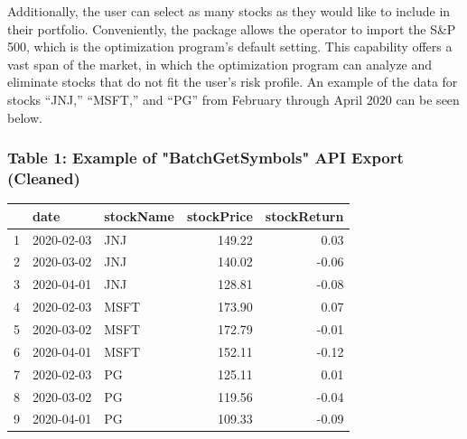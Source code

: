 \documentclass[12pt,english]{article}
\begin{document}
\begin{doublespace}
        Additionally, the user can select as many stocks as they would like to include in their portfolio. Conveniently, the package allows the operator to import the S&P 500, which is the optimization program’s default setting. This capability offers a vast span of the market, in which the optimization program can analyze and eliminate stocks that do not fit the user’s risk profile. An example of the data for stocks “JNJ,” “MSFT,” and “PG” from February through April 2020 can be seen below.
        
        \subsubsection{Table 1: Example of "BatchGetSymbols" API Export (Cleaned)}        
            \begin{center}
                \begin{table}[H]
                \centering
                \begin{tabular}{rllrr}
                  \hline
                 & date & stockName & stockPrice & stockReturn \\ 
                  \hline
                1 & 2020-02-03 & JNJ & 149.22 & 0.03 \\ 
                  2 & 2020-03-02 & JNJ & 140.02 & -0.06 \\ 
                  3 & 2020-04-01 & JNJ & 128.81 & -0.08 \\ 
                  4 & 2020-02-03 & MSFT & 173.90 & 0.07 \\ 
                  5 & 2020-03-02 & MSFT & 172.79 & -0.01 \\ 
                  6 & 2020-04-01 & MSFT & 152.11 & -0.12 \\ 
                  7 & 2020-02-03 & PG & 125.11 & 0.01 \\ 
                  8 & 2020-03-02 & PG & 119.56 & -0.04 \\ 
                  9 & 2020-04-01 & PG & 109.33 & -0.09 \\ 
                   \hline
                \end{tabular}
                \end{table}
            \end{center}
        

\end{doublespace}
\end{document}
